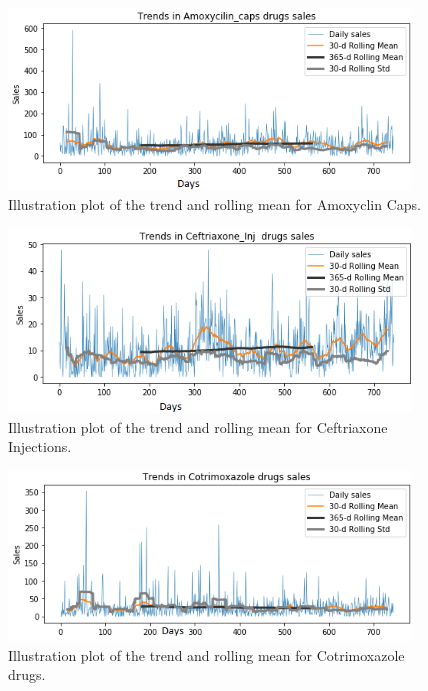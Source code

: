 \documentclass[12pt]{report}
\begin{document}
\begin{figure}[H]%
  \begin {center}
  \includegraphics[width=0.95\textwidth]{images/download (10)A.png}
  \caption{Illustration plot of the trend and rolling mean for Amoxyclin Caps.}
  \label{fig:ecg}
  \end {center}
\end{figure}


\begin{figure}[H]%
  \begin {center}
  \includegraphics[width=0.95\textwidth]{images/download (10)B.png}
  \caption{Illustration plot of the trend and rolling mean for Ceftriaxone Injections.}
  \label{fig:ecg}
  \end {center}
\end{figure}

\begin{figure}[H]%
  \begin {center}
  \includegraphics[width=0.95\textwidth]{images/download (10)C.png}
  \caption{Illustration plot of the trend and rolling mean for Cotrimoxazole drugs.}
  \label{fig:ecg}
  \end {center}
\end{figure}
\end{document}
